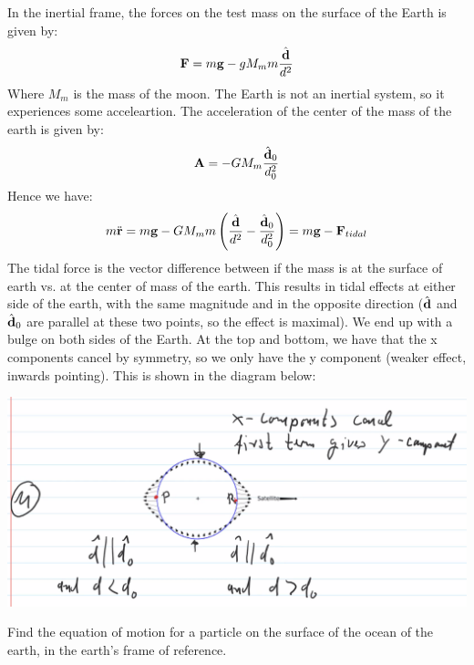 \documentclass[../PHYS306Notes.tex]{subfiles}
\begin{document}
\begin{s}
In the inertial frame, the forces on the test mass on the surface of the Earth is given by:
\[\mathbf{F} = m\mathbf{g} - gM_{m}m\frac{\hat{\mathbf{d}}}{d^2}\]
Where $M_m$ is the mass of the moon. The Earth is not an inertial system, so it experiences some acceleartion. The acceleration of the center of the mass of the earth is given by:
\[\mathbf{A} = -GM_{m}\frac{\hat{\mathbf{d}}_0}{d^2_0}\]
Hence we have:
\[m\ddot{\mathbf{r}} = m\mathbf{g} - GM_mm\left(\frac{\hat{\mathbf{d}}}{d^2} - \frac{\hat{\mathbf{d}}_0}{d^2_0}\right) = m\mathbf{g} - \mathbf{F}_{tidal}\]
The tidal force is the vector difference between if the mass is at the surface of earth vs. at the center of mass of the earth. This results in tidal effects at either side of the earth, with the same magnitude and in the opposite direction ($\hat{\mathbf{d}}$ and $\hat{\mathbf{d}}_0$ are parallel at these two points, so the effect is maximal). We end up with a bulge on both sides of the Earth. At the top and bottom, we have that the x components cancel by symmetry, so we only have the y component (weaker effect, inwards pointing). This is shown in the diagram below:
\begin{center}
    \includegraphics[scale=0.5]{Lecture-14/w14-img5.png}
\end{center}
\end{s}

\begin{p}
Find the equation of motion for a particle on the surface of the ocean of the earth, in the earth’s frame of reference. 
\end{p}
\begin{s}

\end{s}
\end{document}
